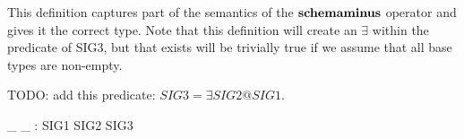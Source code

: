 This definition captures part of the semantics of
the $\mathbin{\textbf{schemaminus}}$ operator and gives it the correct
type.  Note that this definition will create an $\exists$
within the predicate of SIG3, but that exists will be
trivially true if we assume that all base types are non-empty. 

TODO: add this predicate: $SIG3 = \exists SIG2 @ SIG1$.

\begin{gendef}
  \_ \schemaminus \_ : SIG1 \cross SIG2 \fun SIG3
\end{gendef}
